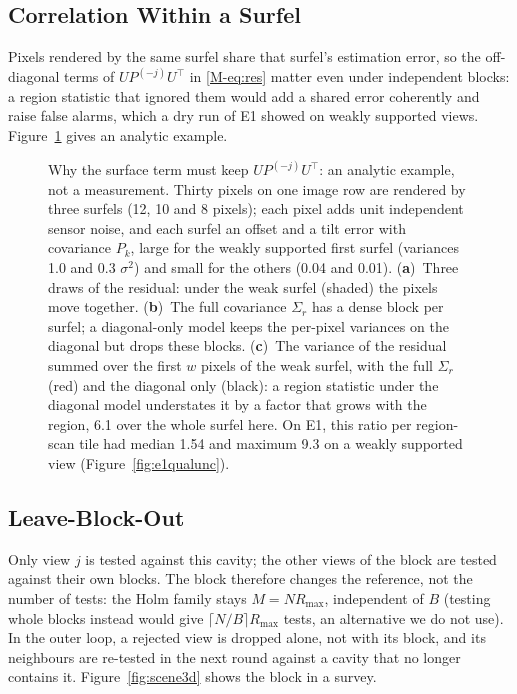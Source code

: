 \subsection{Correlation Within a Surfel}
Pixels rendered by the same surfel share that surfel's estimation error, so the off-diagonal terms of $UP^{(-j)}U^{\top}$ in \eqref{M-eq:res} matter even under independent blocks: a region statistic that ignored them would add a shared error coherently and raise false alarms, which a dry run of E1 showed on weakly supported views. Figure~\ref{fig:upu} gives an analytic example.

\begin{figure}[!t]
\centering

\caption{Why the surface term must keep $UP^{(-j)}U^{\top}$: an analytic example, not a measurement. Thirty
pixels on one image row are rendered by three surfels (12, 10 and 8 pixels); each pixel adds unit
independent sensor noise, and each surfel an offset and a tilt error with covariance $P_k$, large for the
weakly supported first surfel (variances 1.0 and 0.3 $\sigma^{2}$) and small for the others (0.04 and 0.01).
(\textbf{a})~Three draws of the residual: under the weak surfel (shaded) the pixels move together.
(\textbf{b})~The full covariance $\Sigma_r$ has a dense block per surfel; a diagonal-only model keeps the
per-pixel variances on the diagonal but drops these blocks. (\textbf{c})~The variance of the residual summed
over the first $w$ pixels of the weak surfel, with the full $\Sigma_r$ (red) and the diagonal only (black):
a region statistic under the diagonal model understates it by a factor that grows with the region, 6.1 over
the whole surfel here.
On E1, this ratio per region-scan tile had median 1.54 and maximum 9.3 on a weakly supported view
(Figure~\ref{fig:e1qualunc}).}
\label{fig:upu}
\end{figure}

\subsection{Leave-Block-Out}
Only view $j$ is tested against this
cavity; the other views of the block are tested against their own blocks. The block therefore changes
the reference, not the number of tests: the Holm family stays $M=NR_{\max}$, independent of $B$ (testing
whole blocks instead would give $\lceil N/B\rceil R_{\max}$ tests, an alternative we do not use). In the
outer loop, a rejected view is dropped alone, not with its block, and its neighbours are re-tested in the
next round against a cavity that no longer contains it.
Figure~\ref{fig:scene3d} shows the block in a survey.

